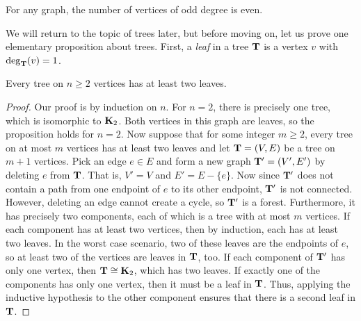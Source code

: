 \begin{corollary}
  For any graph, the number of vertices of odd degree is even.
\end{corollary}

We will return to the topic of trees later, but before moving on, let
us prove one elementary proposition about trees. First, a
\textit{leaf} in a tree $\mathbf{T}$ is a vertex $v$ with $\deg_{\mathbf{T}}(v)=1$.

\begin{proposition}\label{prop:tree-leaves}
  Every tree on $n\geq 2$ vertices has at least two leaves.
\end{proposition}

\begin{proof}
  Our proof is by induction on $n$. For $n=2$, there is precisely one
  tree, which is isomorphic to $\mathbf{K}_2$. Both vertices in this graph
  are leaves, so the proposition holds for $n=2$. Now suppose that for
  some integer $m\geq 2$, every tree on at most $m$ vertices has at
  least two leaves and let $\mathbf{T}=(V,E)$ be a tree on $m+1$ vertices.
  Pick an edge $e\in E$ and form a new graph $\mathbf{T}'=(V',E')$ by
  deleting $e$ from $\mathbf{T}$. That is, $V'=V$ and $E'=E-\{e\}$. Now
  since $\mathbf{T}'$ does not contain a path from one endpoint of $e$ to
  its other endpoint, $\mathbf{T}'$ is not connected. However, deleting an
  edge cannot create a cycle, so $\mathbf{T}'$ is a forest. Furthermore, it
  has precisely two components, each of which is a tree with at most
  $m$ vertices. If each component has at least two vertices, then by
  induction, each has at least two leaves. In the worst case scenario,
  two of these leaves are the endpoints of $e$, so at least two of the
  vertices are leaves in $\mathbf{T}$, too. If each component of $\mathbf{T}'$ has
  only one vertex, then $\mathbf{T}\cong \mathbf{K}_2$, which has two leaves. If
  exactly one of the components has only one vertex, then it must be a
  leaf in $\mathbf{T}$. Thus, applying the inductive hypothesis to the other
  component ensures that there is a second leaf in $\mathbf{T}$.
\end{proof}

